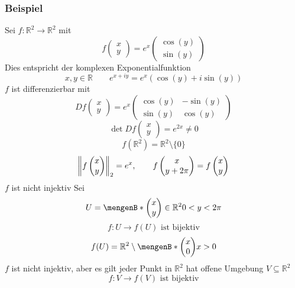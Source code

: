 \subsubsection{Beispiel} %
\label{ssub:beispiel}

Sei $f: \mathbb{R}^2 \to \mathbb{R}^2$ mit
\[
	f \begin{pmatrix}
x \\ y		
	\end{pmatrix} = e^x \begin{pmatrix}
		\cos(y) \\ \sin(y)
	\end{pmatrix}
\] Dies entspricht der komplexen Exponentialfunktion
\[
	x,y \in \mathbb{R} \qquad e^{x+iy}= e^x(\cos(y)+i \sin(y))
\]
$f$ ist differenzierbar mit
	\[
		Df \begin{pmatrix}
			x \\ y
		\end{pmatrix} = e^x \begin{pmatrix}
			\cos(y) & -\sin(y) \\ \sin(y) & \cos(y)
		\end{pmatrix}
	\]
	\[
		\det Df \begin{pmatrix}
			x \\ y
		\end{pmatrix} = e^{2x} \neq 0
	\]
	\[
		f( \mathbb{R}^2) = \mathbb{R}^2 \setminus \{0\}
	\]
	\[
		\norm{f \begin{pmatrix}
			x \\ y
		\end{pmatrix}}_2 = e^x ,\qquad f \begin{pmatrix}
			x \\ y + 2 \pi
		\end{pmatrix} = f \begin{pmatrix}
			x \\ y
		\end{pmatrix}
	\]
$f$ ist nicht injektiv
Sei \[
	U = \set[ \begin{pmatrix}
		x \\ y
	\end{pmatrix} \in \mathbb{R}^2]{0 < y < 2 \pi}
\]
\[
	f: U \to f(U) \text{ ist bijektiv}
\]
\[
	f(U) = \mathbb{R}^2 \setminus \set[\begin{pmatrix}
		x \\ 0 
	\end{pmatrix}]{x > 0}
\] $f$ ist nicht injektiv, aber es gilt jeder Punkt in $\mathbb{R}^2$ hat offene Umgebung $V \subseteq \mathbb{R}^2$ 
\[
	f : V \to f(V) \text{ ist bijektiv}
\]

